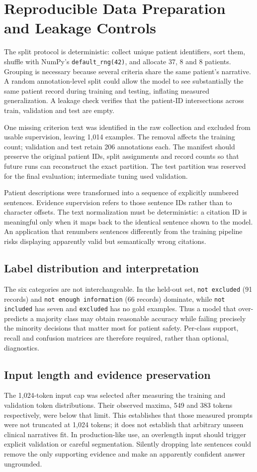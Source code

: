\documentclass[conference]{IEEEtran}
\begin{document}
\section{Reproducible Data Preparation and Leakage Controls}
The split protocol is deterministic: collect unique patient identifiers, sort them, shuffle with NumPy's \texttt{default\_rng(42)}, and allocate 37, 8 and 8 patients. Grouping is necessary because several criteria share the same patient's narrative. A random annotation-level split could allow the model to see substantially the same patient record during training and testing, inflating measured generalization. A leakage check verifies that the patient-ID intersections across train, validation and test are empty.

One missing criterion text was identified in the raw collection and excluded from usable supervision, leaving 1,014 examples. The removal affects the training count; validation and test retain 206 annotations each. The manifest should preserve the original patient IDs, split assignments and record counts so that future runs can reconstruct the exact partition. The test partition was reserved for the final evaluation; intermediate tuning used validation.

Patient descriptions were transformed into a sequence of explicitly numbered sentences. Evidence supervision refers to those sentence IDs rather than to character offsets. The text normalization must be deterministic: a citation ID is meaningful only when it maps back to the identical sentence shown to the model. An application that renumbers sentences differently from the training pipeline risks displaying apparently valid but semantically wrong citations.

\subsection{Label distribution and interpretation}
The six categories are not interchangeable. In the held-out set, \texttt{not excluded} (91 records) and \texttt{not enough information} (66 records) dominate, while \texttt{not included} has seven and \texttt{excluded} has no gold examples. Thus a model that over-predicts a majority class may obtain reasonable accuracy while failing precisely the minority decisions that matter most for patient safety. Per-class support, recall and confusion matrices are therefore required, rather than optional, diagnostics.

\subsection{Input length and evidence preservation}
The 1,024-token input cap was selected after measuring the training and validation token distributions. Their observed maxima, 549 and 383 tokens respectively, were below that limit. This establishes that those measured prompts were not truncated at 1,024 tokens; it does not establish that arbitrary unseen clinical narratives fit. In production-like use, an overlength input should trigger explicit validation or careful segmentation. Silently dropping late sentences could remove the only supporting evidence and make an apparently confident answer ungrounded.
\end{document}
